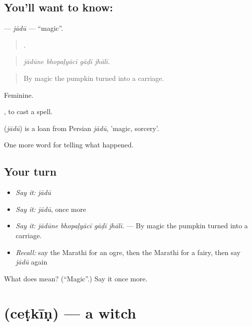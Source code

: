 \subsection*{You'll want to know: }
\textbf{} — \emph{jādū} — \textquotedblleft{}magic\textquotedblright{}.

\begin{quote}
   .
\end{quote}

\begin{quote}
\emph{jādūne bhopaḷyācī gāḍī jhālī.}
\end{quote}

\begin{quote}
By magic the pumpkin turned into a carriage.
\end{quote}

Feminine.

 , to cast a spell.

\begin{cousinweb}
\textbf{} (\emph{jādū}) is a loan from Persian \emph{jādū}, 'magic, sorcery'.
\end{cousinweb}

\begin{grammarlens}[title={What you've built}]
One more word for telling what happened.
\end{grammarlens}

\subsection*{Your turn}
\begin{itemize}
\raggedright
  \item \emph{Say it:} \emph{jādū}
  \item \emph{Say it:} \emph{jādū}, once more
  \item \emph{Say it:} \emph{jādūne bhopaḷyācī gāḍī jhālī.} — By magic the pumpkin turned into a carriage.
  \item \emph{Recall:} say the Marathi for an ogre, then the Marathi for a fairy, then say \emph{jādū} again
\end{itemize}

\begin{tcolorbox}[breakable,colback=teal!4,colframe=teal!35!black,title={Before you move on}]
What does  mean? (\textquotedblleft{}Magic\textquotedblright{}.) Say it once more.
\end{tcolorbox}
\section[\texorpdfstring{\mr{चेटकीण} (ceṭkīṇ)}{चेटकीण (ceṭkīṇ)}]{ (ceṭkīṇ) — a witch}

